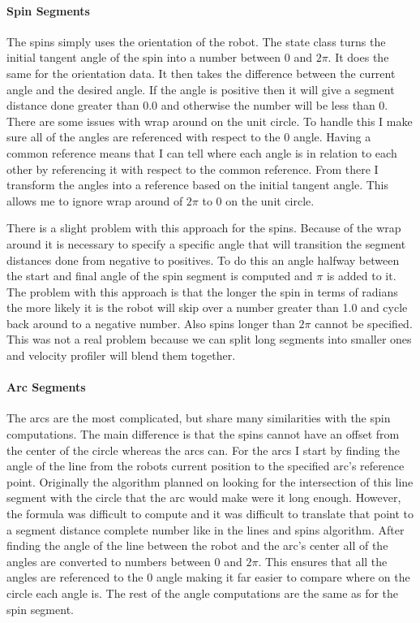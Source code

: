 \paragraph{Spin Segments}
The spins simply uses the orientation of the robot. The state class turns the initial tangent angle of the spin into a number between 0 and $2\pi$. It does the same for the orientation data. It then takes the difference between the current angle and the desired angle.  If the angle is positive then it will give a segment distance done greater than 0.0 and otherwise the number will be less than 0. There are some issues with wrap around on the unit circle.  To handle this I make sure all of the angles are referenced with respect to the 0 angle. Having a common reference means that I can tell where each angle is in relation to each other by referencing it with respect to the common reference. From there I transform the angles into a reference based on the initial tangent angle. This allows me to ignore wrap around of $2\pi$ to 0 on the unit circle.

There is a slight problem with this approach for the spins. Because of the wrap around it is necessary to specify a specific angle that will transition the segment distances done from negative to positives. To do this an angle halfway between the start and final angle of the spin segment is computed and $\pi$ is added to it. The problem with this approach is that the longer the spin in terms of radians the more likely it is the robot will skip over a number greater than 1.0 and cycle back around to a negative number. Also spins longer than $2\pi$ cannot be specified. This was not a real problem because we can split long segments into smaller ones and velocity profiler will blend them together.

\paragraph{Arc Segments}
The arcs are the most complicated, but share many similarities with the spin computations. The main difference is that the spins cannot have an offset from the center of the circle whereas the arcs can. For the arcs I start by finding the angle of the line from the robots current position to the specified arc's reference point. Originally the algorithm planned on looking for the intersection of this line segment with the circle that the arc would make were it long enough. However, the formula was difficult to compute and it was difficult to translate that point to a segment distance complete number like in the lines and spins algorithm. After finding the angle of the line between the robot and the arc's center all of the angles are converted to numbers between 0 and $2\pi$. This ensures that all the angles are referenced to the 0 angle making it far easier to compare where on the circle each angle is. The rest of the angle computations are the same as for the spin segment.

